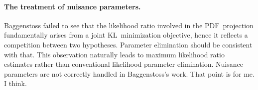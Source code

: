 \documentclass[english]{scrartcl}
\begin{document}
\paragraph{The treatment of nuisance parameters.} Baggenstoss failed to see that the likelihood ratio involved in the PDF~projection fundamentally arises from a joint KL~minimization objective, hence it reflects a competition between two hypotheses. Parameter elimination should be consistent with that. This observation naturally leads to maximum likelihood ratio estimates rather than conventional likelihood parameter elimination. Nuisance parameters are not correctly handled in Baggenstoss's work. That point is for me. I think.










\end{document}

